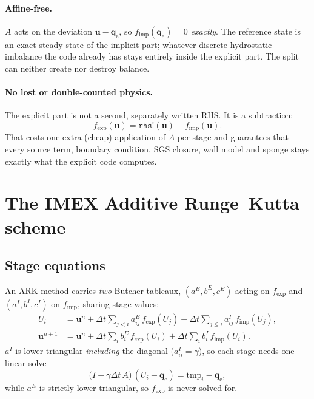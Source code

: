 \documentclass[11pt,a4paper]{article}
\newcommand{\uvec}{\bm{u}}
\newcommand{\qe}{\bm{q}_{\mathrm{e}}}
\newcommand{\fexp}{f_{\mathrm{exp}}}
\newcommand{\fimp}{f_{\mathrm{imp}}}
\begin{document}
\paragraph{Affine-free.} $A$ acts on the deviation $\uvec-\qe$, so
$\fimp(\qe)=0$ \emph{exactly}. The reference state is an exact steady state of
the implicit part; whatever discrete hydrostatic imbalance the code already has
stays entirely inside the explicit part. The split can neither create nor
destroy balance.

\paragraph{No lost or double-counted physics.} The explicit part is not a
second, separately written RHS. It is a subtraction:
\begin{equation}
\fexp(\uvec) = \texttt{rhs!}(\uvec) - \fimp(\uvec).
\end{equation}
That costs one extra (cheap) application of $A$ per stage and guarantees that
every source term, boundary condition, SGS closure, wall model and sponge stays
exactly what the explicit code computes.

\section{The IMEX Additive Runge--Kutta scheme}

\subsection{Stage equations}
An ARK method carries \emph{two} Butcher tableaux, $(a^E,b^E,c^E)$ acting on
$\fexp$ and $(a^I,b^I,c^I)$ on $\fimp$, sharing stage values:
\begin{align}
U_i &= \uvec^n + \Delta t\!\!\sum_{j<i}\! a^E_{ij}\,\fexp(U_j)
                + \Delta t\!\!\sum_{j\le i}\! a^I_{ij}\,\fimp(U_j),\\
\uvec^{n+1} &= \uvec^n + \Delta t\sum_i b^E_i\,\fexp(U_i)
                       + \Delta t\sum_i b^I_i\,\fimp(U_i).
\end{align}
$a^I$ is lower triangular \emph{including} the diagonal ($a^I_{ii}=\gamma$), so
each stage needs one linear solve
\begin{equation}
\big(I-\gamma\Delta t\,A\big)\,(U_i-\qe) = \mathrm{tmp}_i-\qe ,
\label{eq:solve}
\end{equation}
while $a^E$ is strictly lower triangular, so $\fexp$ is never solved for.
\end{document}

